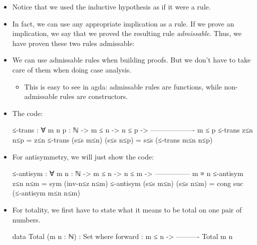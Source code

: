 \documentclass{lecturenotes}
\begin{document}
\begin{itemize}
\begin{proof}
    \noindent \textbf{Inductive case:}
    We know that $m = \textsf{suc}(m')$, $n = \textsf{suc}(n')$, and $m' \leq n'$.
    $$IH = \text{for any } p \in \mathbb{N} \mathrel{\text{if}} n' \leq p \mathrel{\text{then}} m' \leq p$$
    Since we have evidence for $\textsf{suc}(n') = n \le p$, we know that the bottommost rule in this must be \textsf{s≤s}.
    Thus, we must also have evidence that $n' \leq p'$, where $p = \textsf{suc}(p')$.
    That means that we can apply the IH to get that $m' \leq p'$, and then use \textsf{s≤s} to get the desired result.
    Pictorially:
    $$
    \infer*[Right=\textsf{s≤s}]{
      \infer*[Right=IH]{
        m' \leq n'\\
        n' \leq p'
      }{
        m' \leq p'
      }
    }{
      \textsf{suc}(m') = m \leq p = \textsf{suc}(p')
    }
    $$
  \end{proof}
\item Notice that we used the inductive hypothesis as if it were a rule.
\item In fact, we can use any appropriate implication as a rule.
  If we prove an implication, we say that we proved the resulting rule \emph{admissable}.
  Thus, we have proven these two rules admissable:
\item We can use admissable rules when building proofs.
  But we don't have to take care of them when doing case analysis.
  \begin{itemize}
  \item This is easy to see in agda: admissable rules are functions, while non-admissable rules are constructors.
  \end{itemize}
\item The code:
\begin{code}
≤-trans : ∀ {m n p : ℕ} ->
                m ≤ n ->
                n ≤ p ->
          -------------------
                m ≤ p
≤-trans z≤n n≤p = z≤n
≤-trans (s≤s m≤n) (s≤s n≤p) = s≤s (≤-trans m≤n n≤p)
\end{code}
\item For antisymmetry, we will just show the code:
\begin{code}
≤-antisym : ∀ {m n : ℕ} ->
                m ≤ n ->
                n ≤ m ->
            ---------------
                m ≡ n
≤-antisym z≤n n≤m = sym (inv-n≤z n≤m)
≤-antisym (s≤s m≤n) (s≤s n≤m) = cong suc (≤-antisym m≤n n≤m)
\end{code}
\item For totality, we first have to state what it means to be total on one pair of numbers.
\begin{code}
data Total (m n : ℕ) : Set where
  forward :
      m ≤ n ->
    ----------
    Total m n


\end{code}
\end{itemize}
\end{document}
